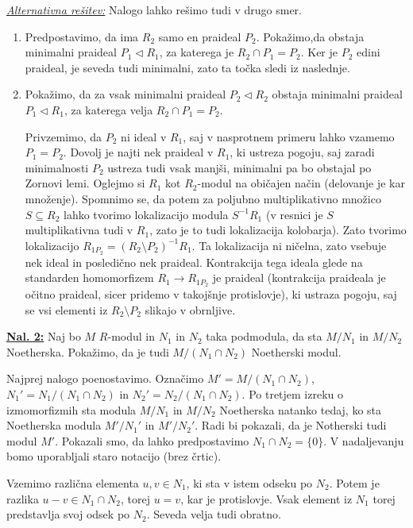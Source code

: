 \documentclass[a4paper, 12pt]{article}
\newcommand{\subideal}{\vartriangleleft}
\begin{document}
\underline{\textit{Alternativna rešitev:}} Nalogo lahko rešimo tudi v drugo smer.
\begin{enumerate}[label=(\alph*)]
	\item Predpostavimo, da ima $R_2$ samo en praideal $P_2$. Pokažimo,da obstaja minimalni praideal $P_1 \subideal R_1$, za katerega je $R_2 \cap P_1 = P_2$. Ker je $P_2$ edini praideal, je seveda tudi minimalni, zato ta točka sledi iz naslednje.
	\item Pokažimo, da za vsak minimalni praideal $P_2 \subideal R_2$ obstaja minimalni praideal $P_1 \subideal R_1$, za katerega velja $R_2 \cap P_1 = P_2$.
	
	Privzemimo, da $P_2$ ni ideal v $R_1$, saj v nasprotnem primeru lahko vzamemo $P_1 = P_2$. Dovolj je najti nek praideal v $R_1$, ki ustreza pogoju, saj zaradi minimalnosti $P_2$ ustreza tudi vsak manjši, minimalni pa bo obstajal po Zornovi lemi.
	Oglejmo si $R_1$ kot $R_2$-modul na običajen način (delovanje je kar množenje). Spomnimo se, da potem za poljubno multiplikativno množico $S \subseteq R_2$ lahko tvorimo lokalizacijo modula $S^{-1}R_1$ (v resnici je $S$ multiplikativna tudi v $R_1$, zato je to tudi lokalizacija kolobarja). Zato tvorimo lokalizacijo $R_{1 P_2} = (R_2 \setminus P_2)^{-1}R_1$. Ta lokalizacija ni ničelna, zato vsebuje nek ideal in posledično nek praideal. Kontrakcija tega ideala glede na standarden homomorfizem $R_1 \to R_{1 P_2}$ je praideal (kontrakcija praideala je očitno praideal, sicer pridemo v takojšnje protislovje), ki ustraza pogoju, saj se vsi elementi iz $R_2 \setminus P_2$ slikajo v obrnljive.
\end{enumerate}


\underline{\textbf{Nal. 2:}}
Naj bo $M$ $R$-modul in $N_1$ in $N_2$ taka podmodula, da sta $M/N_1$ in $M/N_2$ Noetherska. Pokažimo, da je tudi $M/(N_1 \cap N_2)$ Noetherski modul.

Najprej nalogo poenostavimo. Označimo $M' = M/(N_1 \cap N_2)$, $N_1' = N_1/(N_1 \cap N_2)$ in $N_2' = N_2/(N_1 \cap N_2)$. Po tretjem izreku o izmomorfizmih sta modula $M/N_1$ in $M/N_2$ Noetherska natanko tedaj, ko sta Noetherska modula $M'/N_1'$ in $M'/N_2'$. Radi bi pokazali, da je Notherski tudi modul $M'$.  Pokazali smo, da lahko predpostavimo $N_1 \cap N_2 = \lbrace 0 \rbrace$. V nadaljevanju bomo uporabljali staro notacijo (brez črtic).

Vzemimo različna elementa $u,v \in N_1$, ki sta v istem odseku po $N_2$. Potem je razlika $u-v \in N_1 \cap N_2$, torej $u=v$, kar je protislovje. Vsak element iz $N_1$ torej predstavlja svoj odsek po $N_2$. Seveda velja tudi obratno.
\end{document}
